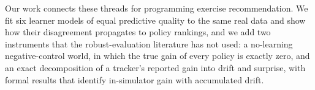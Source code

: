 Our work connects these threads for programming exercise recommendation. We fit six learner models of equal predictive quality to the same real data and show how their disagreement propagates to policy rankings, and we add two instruments that the robust-evaluation literature has not used: a no-learning negative-control world, in which the true gain of every policy is exactly zero, and an exact decomposition of a tracker's reported gain into drift and surprise, with formal results that identify in-simulator gain with accumulated drift.
